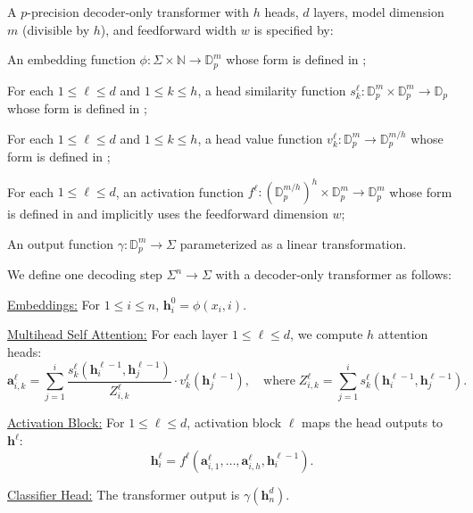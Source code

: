 \begin{definition}
A $p$-precision decoder-only transformer with $h$ heads, $d$ layers, model dimension $m$ (divisible by $h$), and feedforward width $w$ is specified by:
\begin{compactenum}
    \item An embedding function $\phi : \Sigma \times \mathbb N \to \mathbb D_p^m$ whose form is defined in ;
    \item For each $1 \leq \ell \leq d$ and $1 \leq k \leq h$, a head similarity function $s^\ell_k : \mathbb D_p^m \times \mathbb D_p^m \to \mathbb D_p$ whose form is defined in ;
    \item For each $1 \leq \ell \leq d$ and $1 \leq k \leq h$, a head value function $v^{\ell}_k : \mathbb D_p^m \to \mathbb D_p^{m/h}$ whose form is defined in ;
    \item For each $1 \leq \ell \leq d$, an activation function $f^\ell : (\mathbb D_p^{m/h})^h \times \mathbb D_p^m \to \mathbb D_p^m$ whose form is defined in  and implicitly uses the feedforward dimension $w$;
    \item An output function $\gamma : \mathbb D_p^m \to \Sigma$ parameterized as a linear transformation.
\end{compactenum}
\end{definition}

\begin{definition} \label{def:transformer-computation}
We define one decoding step $\Sigma^n \to \Sigma$ with a decoder-only transformer as follows:
\begin{compactenum}
    \item \underline{Embeddings:} For $1 \leq i \leq n$, $\mathbf h^0_i = \phi(x_i, i)$.
    \item \underline{Multihead Self Attention:} For each layer $1 \leq \ell \leq d$, we compute $h$ attention heads:
    \begin{equation*}
        \mathbf a^{\ell}_{i,k} = \sum_{j=1}^i \frac{s^{\ell}_k(\mathbf h^{\ell-1}_i, \mathbf h^{\ell-1}_j)}{Z^\ell_{i,k}} \cdot v^{\ell}_k(\mathbf h^{\ell-1}_j) ,
        \quad \textrm{where} \;
        Z^\ell_{i,k} = \sum_{j=1}^i s^{\ell}_k(\mathbf h^{\ell-1}_i, \mathbf h^{\ell-1}_j) .
    \end{equation*}

    \item \underline{Activation Block:} For $1 \leq \ell \leq d$, activation block $\ell$ maps the head outputs to $\mathbf h^\ell$:
    \begin{equation*}
        \mathbf h^{\ell}_i = f^{\ell}(\mathbf a^{\ell}_{i,1}, \ldots, \mathbf a^{\ell}_{i,h}, \mathbf h^{\ell-1}_i) .
    \end{equation*}
    \item \underline{Classifier Head:} The transformer output is $\gamma(\mathbf h^d_n)$.
\end{compactenum}
\end{definition}

